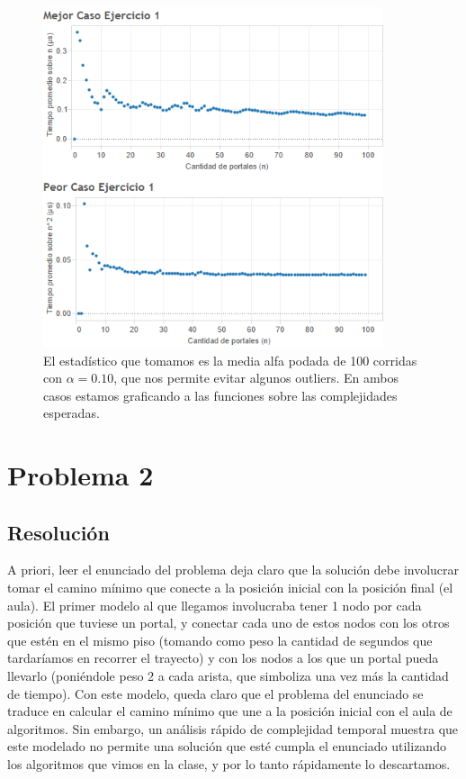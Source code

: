 \documentclass{article}
\theoremstyle{definition}
\theoremstyle{remark}
\begin{document}
\begin{figure}
\centering
\includegraphics[width=10cm]{ex1}
\caption{El estadístico que tomamos es la media alfa podada de 100 corridas con $\alpha = 0.10$, que nos permite evitar algunos outliers. En ambos casos estamos graficando a las funciones sobre las complejidades esperadas. \label{grf:ex1}}
\end{figure}

\pagebreak

\section{Problema 2}

\subsection{Resolución}

A priori, leer el enunciado del problema deja claro que la solución debe involucrar tomar el camino mínimo que conecte a la posición inicial con la posición final (el aula). El primer modelo al que llegamos involucraba tener 1 nodo por cada posición que tuviese un portal, y conectar cada uno de estos nodos con los otros que estén en el mismo piso (tomando como peso la cantidad de segundos que tardaríamos en recorrer el trayecto) y con los nodos a los que un portal pueda llevarlo (poniéndole peso 2 a cada arista, que simboliza una vez más la cantidad de tiempo). Con este modelo, queda claro que el problema del enunciado se traduce en calcular el camino mínimo que une a la posición inicial con el aula de algoritmos. Sin embargo, un análisis rápido de complejidad temporal muestra que este modelado no permite una solución que esté cumpla el enunciado utilizando los algoritmos que vimos en la clase, y por lo tanto rápidamente lo descartamos.
\end{document}
